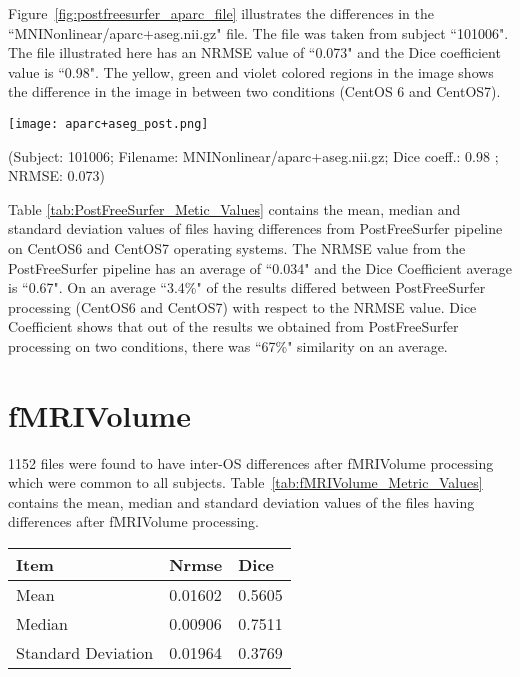 Figure~\ref{fig:postfreesurfer_aparc_file} illustrates the differences in the ``MNINonlinear/aparc+aseg.nii.gz" file. The file was taken from subject ``101006". The file illustrated here has an NRMSE value of ``0.073" and the Dice coefficient value is ``0.98". The yellow, green and violet colored regions in the image shows the difference in the image in between two conditions (CentOS 6 and CentOS7).
\hfill \break
\begin{center}
\texttt{[image: aparc+aseg\_post.png]}
\caption*{(Subject: 101006; Filename: MNINonlinear/aparc+aseg.nii.gz; Dice coeff.: 0.98 ; NRMSE: 0.073)}
\label{fig:postfreesurfer_aparc_file}
\end{center}
\hfill \break

Table \ref{tab:PostFreeSurfer_Metic_Values} contains the mean, median and standard deviation values of files having differences from PostFreeSurfer pipeline on CentOS6 and CentOS7 operating systems. The NRMSE value from the PostFreeSurfer pipeline has an average of ``0.034" and the Dice Coefficient average is ``0.67". On an average ``3.4\%" of the results differed between PostFreeSurfer processing (CentOS6 and CentOS7) with respect to the NRMSE value. Dice Coefficient shows that out of the results we obtained from PostFreeSurfer processing on two conditions, there was ``67\%" similarity on an average.
\section{fMRIVolume}\label{sec:fMRI}
1152 files were found to have inter-OS differences after fMRIVolume processing which were common to all subjects. Table~\ref{tab:fMRIVolume_Metric_Values} contains the mean, median and standard deviation values of the files having differences after fMRIVolume processing.
\hfill \break
\begin{center}
\begin{tabular}{|l|l|l|}
\hline
\textbf{Item}      & \textbf{Nrmse}  & \textbf{Dice} \\ \hline
Mean               & 0.01602     & 0.5605   \\ \hline
Median             & 0.00906     & 0.7511   \\ \hline
Standard Deviation & 0.01964     & 0.3769   \\ \hline
\end{tabular}
\label{tab:fMRIVolume_Metric_Values}
\end{center}
\hfill \break

